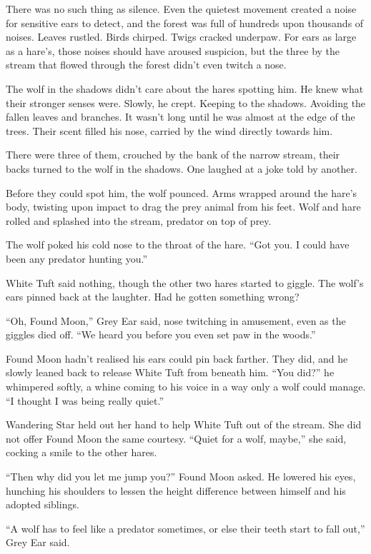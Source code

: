 There was no such thing as silence. Even the quietest movement created a noise for sensitive ears to detect, and the forest was full of hundreds upon thousands of noises. Leaves rustled. Birds chirped. Twigs cracked underpaw. For ears as large as a hare's, those noises should have aroused suspicion, but the three by the stream that flowed through the forest didn't even twitch a nose.

The wolf in the shadows didn't care about the hares spotting him. He knew what their stronger senses were. Slowly, he crept. Keeping to the shadows. Avoiding the fallen leaves and branches. It wasn't long until he was almost at the edge of the trees. Their scent filled his nose, carried by the wind directly towards him.

There were three of them, crouched by the bank of the narrow stream, their backs turned to the wolf in the shadows. One laughed at a joke told by another.

Before they could spot him, the wolf pounced. Arms wrapped around the hare's body, twisting upon impact to drag the prey animal from his feet. Wolf and hare rolled and splashed into the stream, predator on top of prey.

The wolf poked his cold nose to the throat of the hare. ``Got you. I could have been any predator hunting you.''

White Tuft said nothing, though the other two hares started to giggle. The wolf's ears pinned back at the laughter. Had he gotten something wrong?

``Oh, Found Moon,'' Grey Ear said, nose twitching in amusement, even as the giggles died off. ``We heard you before you even set paw in the woods.''

Found Moon hadn't realised his ears could pin back farther. They did, and he slowly leaned back to release White Tuft from beneath him. ``You did?'' he whimpered softly, a whine coming to his voice in a way only a wolf could manage. ``I thought I was being really quiet.''

Wandering Star held out her hand to help White Tuft out of the stream. She did not offer Found Moon the same courtesy. ``Quiet for a wolf, maybe,'' she said, cocking a smile to the other hares.

``Then why did you let me jump you?'' Found Moon asked. He lowered his eyes, hunching his shoulders to lessen the height difference between himself and his adopted siblings.

``A wolf has to feel like a predator sometimes, or else their teeth start to fall out,'' Grey Ear said.

